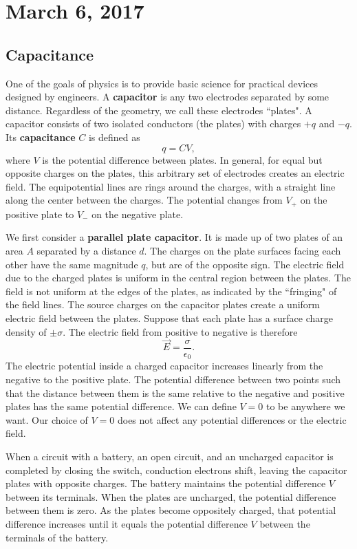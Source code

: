 \documentclass[11pt]{article}
\theoremstyle{plain} %
\theoremstyle{definition}
\theoremstyle{example}
\theoremstyle{remark}
\begin{document}
\section{March 6, 2017}
\subsection{Capacitance}

One of the goals of physics is to provide basic science for practical devices designed by engineers. A \textbf{capacitor} is any two electrodes separated by some distance. Regardless of the geometry, we call these electrodes ``plates". A capacitor consists of two isolated conductors (the plates) with charges $+q$ and $-q$. Its \textbf{capacitance} $C$ is defined as 
$$q = CV,$$
where $V$ is the potential difference between plates. In general, for equal but opposite charges on the plates, this arbitrary set of electrodes creates an electric field. The equipotential lines are rings around the charges, with a straight line along the center between the charges. The potential changes from $V_+$ on the positive plate to $V_-$ on the negative plate. 

We first consider a \textbf{parallel plate capacitor}. It is made up of two plates of an area $A$ separated by a distance $d$. The charges on the plate surfaces facing each other have the same magnitude $q$, but are of the opposite sign. The electric field due to the charged plates is uniform in the central region between the plates. The field is not uniform at the edges of the plates, as indicated by the ``fringing" of the field lines. The source charges on the capacitor plates create a uniform electric field between the plates. Suppose that each plate has a surface charge density of $\pm \sigma$. The electric field from positive to negative is therefore 
$$\vec{E} = \frac{\sigma}{\epsilon_0}.$$ The electric potential inside a charged capacitor increases linearly from the negative to the positive plate. The potential difference between two points such that the distance between them is the same relative to the negative and positive plates has the same potential difference. We can define $V=0$ to be anywhere we want. Our choice of $V=0$ does not affect any potential differences or the electric field. 

When a circuit with a battery, an open circuit, and an uncharged capacitor is completed by closing the switch, conduction electrons shift, leaving the capacitor plates with opposite charges. The battery maintains the potential difference $V$ between its terminals. When the plates are uncharged, the potential difference between them is zero. As the plates become oppositely charged, that potential difference increases until it equals the potential difference $V$ between the terminals of the battery.
\end{document}
